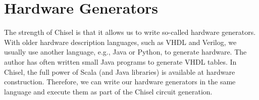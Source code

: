 \documentclass[%
    10pt,
    headinclude, footexclude,
    openright, %
    notitlepage,
    cleardoubleempty,
    headsepline,
    pointlessnumbers,
    bibtotoc, idxtotoc,
    ]{scrbook}
\newcommand{\myref}[2]{\href{#1}{#2}}
\renewcommand{\myref}[2]{{#2}{\footnote{\url{#1}}}}
\begin{document}
%
%
%
%
%
%
%
%
%


\chapter{Hardware Generators}

The strength of Chisel is that it allows us to write so-called hardware generators.
With older hardware description languages, such as VHDL and Verilog,
we usually use another language, e.g., Java or Python, to generate hardware.
The author has often written small Java programs to generate VHDL tables.
In Chisel, the full power of Scala (and Java libraries) is available at hardware
construction. Therefore, we can write our hardware generators in the same
language and execute them as part of the Chisel circuit generation.
\end{document}

